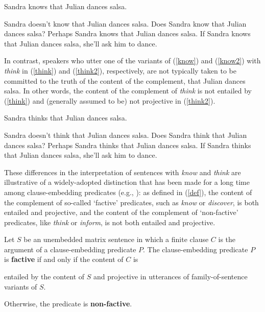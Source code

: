 \documentclass[11pt,fleqn]{article}
\newcommand{\6}{\mbox{$[\hspace*{-.6mm}[$}}
\newcommand{\9}{\mbox{$]\hspace*{-.6mm}]$}}
\begin{document}
\begin{exe}

\ex\label{know} Sandra knows that Julian dances salsa.

\ex\label{know2} 

\begin{xlist} 
\ex Sandra doesn't know that Julian dances salsa. 
\ex Does Sandra know that Julian dances salsa?
\ex Perhaps Sandra knows that Julian dances salsa.
\ex If Sandra knows that Julian dances salsa, she'll ask him to dance. 
\end{xlist}

\end{exe}

In contrast, speakers who utter one of the variants of (\ref{know}) and (\ref{know2}) with {\em think} in (\ref{think}) and (\ref{think2}), respectively, are not typically taken to be committed to the truth of the content of the complement, that Julian dances salsa. In other words, the content of the complement of {\em think} is not entailed by (\ref{think}) and (generally assumed to be) not projective in (\ref{think2}).

\begin{exe}

\ex\label{think} Sandra thinks that Julian dances salsa.
\ex\label{think2} 

\begin{xlist} 
\ex Sandra doesn't think that Julian dances salsa. 
\ex Does Sandra think that Julian dances salsa?
\ex Perhaps Sandra thinks that Julian dances salsa.
\ex If Sandra thinks that Julian dances salsa, she'll ask him to dance. 
\end{xlist}

\end{exe}

These differences in the interpretation of sentences with {\em know} and {\em think} are illustrative of a widely-adopted distinction that has been made for a long time among clause-embedding predicates (e.g., \citealt{karttunen71b,kiparsky-kiparsky71}): as defined in (\ref{def}), the content of the complement of so-called `factive' predicates, such as {\em know} or {\em discover}, is both entailed and projective, and the content of the complement of `non-factive' predicates, like {\em think} or {\em inform},  is not both entailed and projective. 

\begin{exe}
\ex\label{def} Let $S$ be an unembedded matrix sentence in which a finite clause $C$ is the argument of a clause-embedding predicate $P$. The clause-embedding predicate $P$ is {\bf factive} if and only if the content of $C$ is

\begin{xlist}
\ex entailed by the content of $S$ and
\ex projective in utterances of family-of-sentence variants of $S$.
\end{xlist}
Otherwise, the predicate is {\bf non-factive}.
\end{exe}
\end{document}
